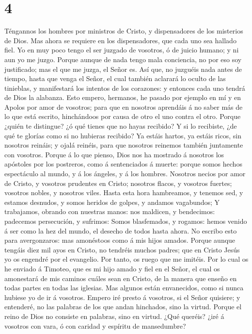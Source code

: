 \hypertarget{section-3}{%
\section{4}\label{section-3}}

 Téngannos los hombres por ministros de Cristo, y
dispensadores de los misterios de Dios.  Mas ahora se
requiere en los dispensadores, que cada uno sea hallado fiel.
 Yo en muy poco tengo el ser juzgado de vosotros, ó de
juicio humano; y ni aun yo me juzgo.  Porque aunque de nada
tengo mala conciencia, no por eso soy justificado; mas el que me juzga,
el Señor es.  Así que, no juzguéis nada antes de tiempo,
hasta que venga el Señor, el cual también aclarará lo oculto de las
tinieblas, y manifestará los intentos de los corazones: y entonces cada
uno tendrá de Dios la alabanza.  Esto empero, hermanos, he
pasado por ejemplo en mí y en Apolos por amor de vosotros; para que en
nosotros aprendáis á no saber más de lo que está escrito, hinchándoos
por causa de otro el uno contra el otro.  Porque ¿quién te
distingue? ¿ó qué tienes que no hayas recibido? Y si lo recibiste, ¿de
qué te glorías como si no hubieras recibido?  Ya estáis
hartos, ya estáis ricos, sin nosotros reináis; y ojalá reinéis, para que
nosotros reinemos también juntamente con vosotros.  Porque á
lo que pienso, Dios nos ha mostrado á nosotros los apóstoles por los
postreros, como á sentenciados á muerte: porque somos hechos espectáculo
al mundo, y á los ángeles, y á los hombres.  Nosotros
necios por amor de Cristo, y vosotros prudentes en Cristo; nosotros
flacos, y vosotros fuertes; vosotros nobles, y nosotros viles.
 Hasta esta hora hambreamos, y tenemos sed, y estamos
desnudos, y somos heridos de golpes, y andamos vagabundos; 
Y trabajamos, obrando con nuestras manos: nos maldicen, y bendecimos:
padecemos persecución, y sufrimos:  Somos blasfemados, y
rogamos: hemos venido á ser como la hez del mundo, el desecho de todos
hasta ahora.  No escribo esto para avergonzaros: mas
amonéstoos como á mis hijos amados.  Porque aunque tengáis
diez mil ayos en Cristo, no tendréis muchos padres; que en Cristo Jesús
yo os engendré por el evangelio.  Por tanto, os ruego que
me imitéis.  Por lo cual os he enviado á Timoteo, que es mi
hijo amado y fiel en el Señor, el cual os amonestará de mis caminos
cuáles sean en Cristo, de la manera que enseño en todas partes en todas
las iglesias.  Mas algunos están envanecidos, como si nunca
hubiese yo de ir á vosotros.  Empero iré presto á vosotros,
si el Señor quisiere; y entenderé, no las palabras de los que andan
hinchados, sino la virtud.  Porque el reino de Dios no
consiste en palabras, sino en virtud.  ¿Qué queréis? ¿iré á
vosotros con vara, ó con caridad y espíritu de mansedumbre?

